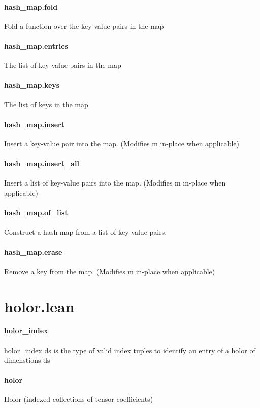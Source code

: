 \documentclass{article}
\begin{document}
\paragraph{hash\_map.fold}
\par
Fold a function over the key-value pairs in the map
\paragraph{hash\_map.entries}
\par
The list of key-value pairs in the map
\paragraph{hash\_map.keys}
\par
The list of keys in the map
\paragraph{hash\_map.insert}
\par
Insert a key-value pair into the map. (Modifies 
\colorbox[RGB]{253,246,227}{{{{\color[RGB]{101, 123, 131} m }}}} in-place when applicable)
\paragraph{hash\_map.insert\_all}
\par
Insert a list of key-value pairs into the map. (Modifies 
\colorbox[RGB]{253,246,227}{{{{\color[RGB]{101, 123, 131} m }}}} in-place when applicable)
\paragraph{hash\_map.of\_list}
\par
Construct a hash map from a list of key-value pairs.
\paragraph{hash\_map.erase}
\par
Remove a key from the map. (Modifies 
\colorbox[RGB]{253,246,227}{{{{\color[RGB]{101, 123, 131} m }}}} in-place when applicable)
\section{holor.lean}\paragraph{holor\_index}
\par
\colorbox[RGB]{253,246,227}{{{{\color[RGB]{101, 123, 131} holor\_index ds }}}} is the type of valid index tuples to identify an entry of a holor of dimenstions 
\colorbox[RGB]{253,246,227}{{{{\color[RGB]{101, 123, 131} ds }}}}\paragraph{holor}
\par
Holor (indexed collections of tensor coefficients)
\end{document}
